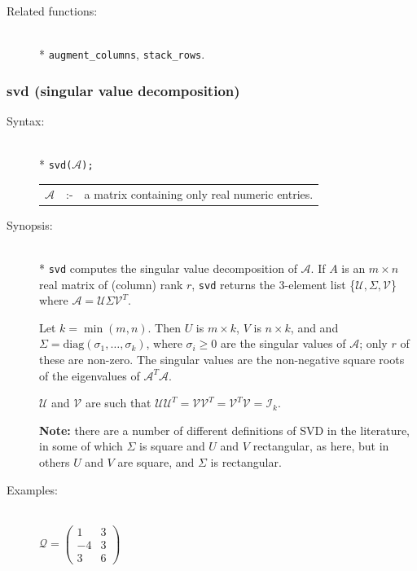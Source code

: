 {\begin{description}
\item[Related functions:]\mbox{}\\*
\texttt{augment\_columns}, \texttt{stack\_rows}.
\end{description}


\subsubsection{svd (singular value decomposition)}
\label{linalg:svd}
\hypertarget{operator:SVD}{}

\begin{description}
\item[Syntax:]\mbox{}\\*
{\tt svd($\mathcal{A}$);}\\[2mm]
\begin{tabular}{l l l}
$\mathcal{A}$ &:-& a matrix containing only real numeric entries.
\end{tabular}

\item[Synopsis:]\mbox{}\\*
\texttt{svd} computes the singular value decomposition of $\mathcal{A}$.
If $A$
is an $m\times n$ real matrix of (column) rank $r$, \texttt{svd} returns the
3-element list \{$\mathcal{U},\Sigma,\mathcal{V}$\} where $\mathcal{A} =
\mathcal{U} \Sigma \mathcal{V}^T$.

Let $k=\min(m,n)$.  Then $U$ is $m\times k$,
$V$ is $n\times k$, and and $\Sigma = \mbox{diag}(\sigma_{1}, \ldots ,\sigma_{k})$,
where $\sigma_{i}\ge 0$ are the singular values of $\mathcal{A}$; only $r$ of
these are non-zero.  The singular values are the non-negative square roots of
the eigenvalues of $\mathcal{A}^T \mathcal{A}$.

$\mathcal{U}$ and $\mathcal{V}$ are such that $\mathcal{UU}^T = \mathcal{VV}^T =
\mathcal{V}^T \mathcal{V} = \mathcal{I}_k$.

\textbf{Note:} there are a number of different definitions of SVD in the
literature, in some of which $\Sigma$ is square and $U$ and $V$ rectangular, as
here, but in others $U$ and $V$ are square, and $\Sigma$ is rectangular.

\item[Examples:]\mbox{}\\
  \( \mathcal{Q} = \begin{pmatrix} 1 & 3 \\ -4 & 3 \\ 3 & 6 \end{pmatrix}\)


\end{description}}
